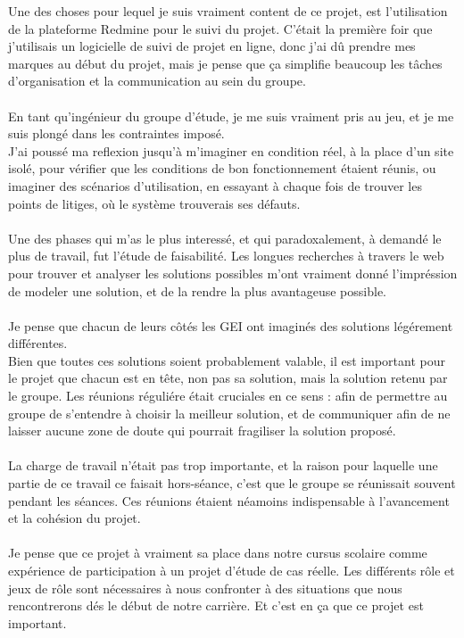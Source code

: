 Une des choses pour lequel je suis vraiment content de ce projet, est l'utilisation de la plateforme Redmine pour le suivi du projet. C'était la première foir que j'utilisais un logicielle de suivi de projet en ligne, donc j'ai dû prendre mes marques au début du projet, mais je pense que ça simplifie beaucoup les tâches d'organisation et la communication au sein du groupe.
\\~\\

En tant qu'ingénieur du groupe d'étude, je me suis vraiment pris au jeu, et je me suis plongé dans les contraintes imposé.\\
J'ai poussé ma reflexion jusqu'à m'imaginer en condition réel, à la place d'un site isolé, pour vérifier que les conditions de bon fonctionnement étaient réunis, ou imaginer des scénarios d'utilisation, en essayant à chaque fois de trouver les points de litiges, où le système trouverais ses défauts.
\\~\\

Une des phases qui m'as le plus interessé, et qui paradoxalement, à demandé le plus de travail, fut l'étude de faisabilité.
Les longues recherches à travers le web pour trouver et analyser les solutions possibles m'ont vraiment donné l'impréssion de modeler une solution, et de la rendre la plus avantageuse possible.
\\~\\

Je pense que chacun de leurs côtés les GEI ont imaginés des solutions légérement différentes.\\
Bien que toutes ces solutions soient probablement valable, il est important pour le projet que chacun est en tête, non pas sa solution, mais la solution retenu par le groupe. Les réunions réguliére était cruciales en ce sens : afin de permettre au groupe de s'entendre à choisir la meilleur solution, et de communiquer afin de ne laisser aucune zone de doute qui pourrait fragiliser la solution proposé.
\\~\\

La charge de travail n'était pas trop importante, et la raison pour laquelle une partie de ce travail ce faisait hors-séance, c'est que le groupe se réunissait souvent pendant les séances. Ces réunions étaient néamoins indispensable à l'avancement et la cohésion du projet.
\\~\\

Je pense que ce projet à vraiment sa place dans notre cursus scolaire comme expérience de participation à un projet d'étude de cas réelle. Les différents rôle et jeux de rôle sont nécessaires à nous confronter à des situations que nous rencontrerons dés le début de notre carrière. Et c'est en ça que ce projet est important.

